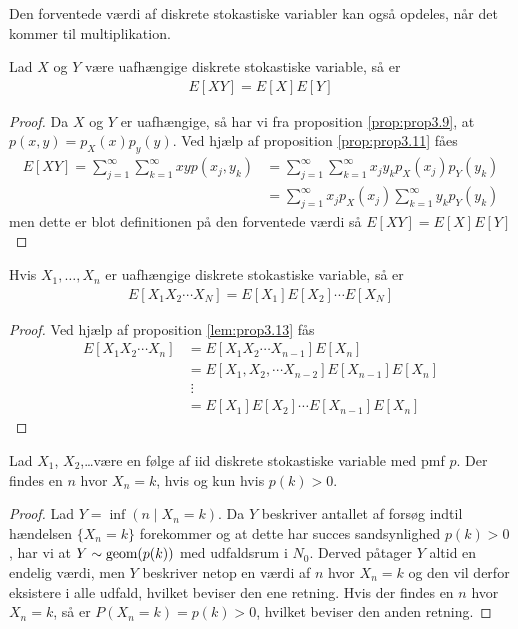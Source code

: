Den forventede værdi af diskrete stokastiske variabler kan også opdeles, når det kommer til multiplikation.  
\begin{lem} \label{lem:prop3.13} %
    Lad $X$ og $Y$ være uafhængige diskrete stokastiske variable, så er 
    \begin{align*}
        E[XY]=E[X]E[Y]
    \end{align*}
\end{lem}
\begin{proof}
    Da $X$ og $Y$ er uafhængige, så har vi fra proposition \ref{prop:prop3.9}, at $p(x,y)=p_X(x)p_y(y)$. Ved hjælp af proposition \ref{prop:prop3.11} fåes
    \begin{align*}
        E[XY]=\sum_{j=1}^\infty\sum_{k=1}^\infty xyp(x_j,y_k)&=\sum_{j=1}^\infty\sum_{k=1}^\infty x_jy_kp_X(x_j)p_Y(y_k)\\ &=\sum_{j=1}^\infty x_jp_X(x_j)\sum_{k=1}^\infty y_kp_Y(y_k)
    \end{align*}
    men dette er blot definitionen på den forventede værdi så $E[XY] = E[X]E[Y]$
\end{proof}

\begin{prop} \label{prop:prop3.15} %
    Hvis $X_1,\ldots, X_n$ er uafhængige diskrete stokastiske variable, så er
\begin{align*}
    E[X_1X_2\cdots X_N]=E[X_1]E[X_2]\cdots E[X_N]
\end{align*}
\end{prop}
\begin{proof}
Ved hjælp af proposition \ref{lem:prop3.13} fås
    \begin{align*}
        E[X_1X_2\cdots X_n]
        &=E[X_1X_2\cdots X_{n-1}]E[X_n]
        \\
        &=E[X_1,X_2,\cdots X_{n-2}]E[X_{n-1}]E[X_n]\\
        &\; \vdots \\
        &=E[X_1]E[X_2]\cdots E[X_{n-1}]E[X_n]
    \end{align*}
\end{proof}

\begin{prop}
    Lad $X_1$, $X_2$,\dots være en følge af iid diskrete stokastiske variable med pmf $p$.
    Der findes en $n$ hvor $X_n=k$, hvis og kun hvis $p(k)>0$.
\end{prop}

\begin{proof}
    Lad $Y=\inf(n\mid X_n=k)$.
    Da $Y$ beskriver antallet af forsøg indtil hændelsen $\{X_n=k\}$ forekommer og at dette har succes sandsynlighed $p(k)>0$, har vi at $Y\sim \textnormal{geom}(p(k))$ med udfaldsrum i $N_0$.
    Derved påtager $Y$ altid en endelig værdi, men $Y$ beskriver netop en værdi af $n$ hvor $X_n=k$ og den vil derfor eksistere i alle udfald, hvilket beviser den ene retning. Hvis der findes en $n$ hvor $X_n=k$, så er $P(X_n=k)=p(k)>0$, hvilket beviser den anden retning.
\end{proof}